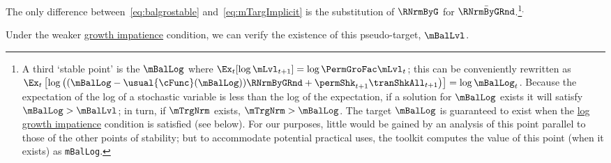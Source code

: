 \documentclass[\econtexRoot/BufferStockTheory]{subfiles}
\begin{document}
The only difference between~\eqref{eq:balgrostable} and~\eqref{eq:mTargImplicit} is the substitution of $\RNrmByG$ for $\bar{\RNrmByGRnd}$.\footnote{A third `stable point' is the $\mBalLog$ where $\Ex_{t}[\log \mLvl_{t+1}] = \log \PermGroFac \mLvl_{t}$; this can be conveniently rewritten as $\Ex_{t}\left[\log\left((\mBalLog-\usual{\cFunc}(\mBalLog))\RNrmByGRnd+\permShk_{t+1}\tranShkAll_{t+1}\right)\right]  = \log \mBalLog_{t}$.
Because the expectation of the log of a stochastic variable is less than the log of the expectation, if a solution for $\mBalLog$ exists it will satisfy $\mBalLog > \mBalLvl$; in turn, if $\mTrgNrm$ exists, $\mTrgNrm>\mBalLog$.
The target $\mBalLog$ is guaranteed to exist when the \hyperlink{GICSdl}{log growth impatience} condition is satisfied (see below).
For our purposes, little would be gained by an analysis of this point parallel to those of the other points of stability; but to accommodate potential practical uses,  the {\ARKurl} toolkit computes the value of this point (when it exists) as \texttt{mBalLog}.}$^{,}$


Under the weaker  \hyperlink{GICRaw}{growth impatience} condition, we can verify the existence of this pseudo-target, $\mBalLvl$.
\end{document}
